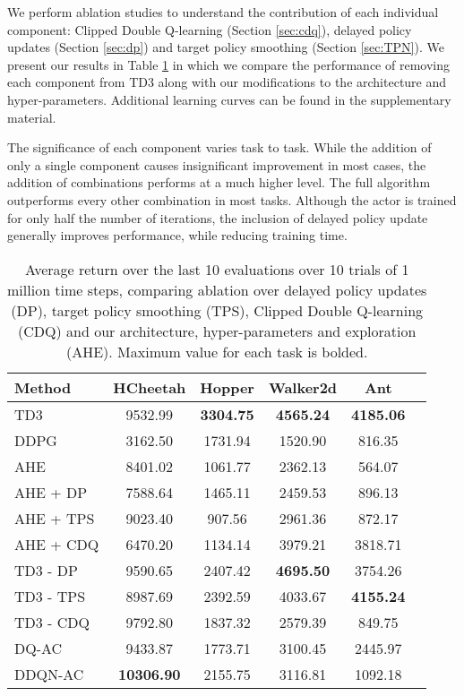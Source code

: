 \documentclass{article}
\begin{document}
We perform ablation studies to understand the contribution of each individual component: Clipped Double Q-learning (Section \ref{sec:cdq}), delayed policy updates (Section \ref{sec:dp}) and target policy smoothing (Section \ref{sec:TPN}). We present our results in Table \ref{table:ablation} in which we compare the performance of removing each component from TD3 along with our modifications to the architecture and hyper-parameters. Additional learning curves can be found in the supplementary material. 

The significance of each component varies task to task. While the addition of only a single component causes insignificant improvement in most cases, the addition of combinations performs at a much higher level.  The full algorithm outperforms every other combination in most tasks. Although the actor is trained for only half the number of iterations, the inclusion of delayed policy update generally improves performance, while reducing training time. 

\begin{table}[ht]
\centering
\caption{Average return over the last 10 evaluations over 10 trials of 1 million time steps, comparing ablation over delayed policy updates (DP), target policy smoothing (TPS), Clipped Double Q-learning (CDQ) and our architecture, hyper-parameters and exploration (AHE). Maximum value for each task is bolded.}
\label{table:ablation}
\begin{center}
\begin{small}
\begin{tabular}{lccccr}
\toprule
\bf{Method} & \bf{HCheetah}&\bf{Hopper}	& \bf{Walker2d} & \bf{Ant} \\
\midrule
TD3 		& 9532.99 		& \bf{3304.75} 	& \bf{4565.24} 	& \bf{4185.06} \\
DDPG		& 3162.50 		& 1731.94 		& 1520.90 		& 816.35 \\
AHE			& 8401.02 		& 1061.77 		& 2362.13 		& 564.07 \\
\midrule
AHE + DP 	& 7588.64 		& 1465.11 		& 2459.53 		& 896.13 \\
AHE + TPS 	& 9023.40 		& 907.56 		& 2961.36 		& 872.17 \\
AHE + CDQ 	& 6470.20 		& 1134.14 		& 3979.21 		& 3818.71 \\
\midrule
TD3 - DP 	& 9590.65		& 2407.42 		& \bf{4695.50} 	& 3754.26 \\
TD3 - TPS 	& 8987.69 		& 2392.59 		& 4033.67 		& \bf{4155.24} \\
TD3 - CDQ 	& 9792.80	  	& 1837.32 		& 2579.39 		& 849.75 \\
\midrule
DQ-AC 		& 9433.87		& 1773.71		& 3100.45 		& 2445.97 \\
DDQN-AC 	& \bf{10306.90}	& 2155.75 		& 3116.81 		& 1092.18 \\
\bottomrule
\end{tabular}
\end{small}
\end{center}
\vskip -0.1in
\end{table}
\end{document}
